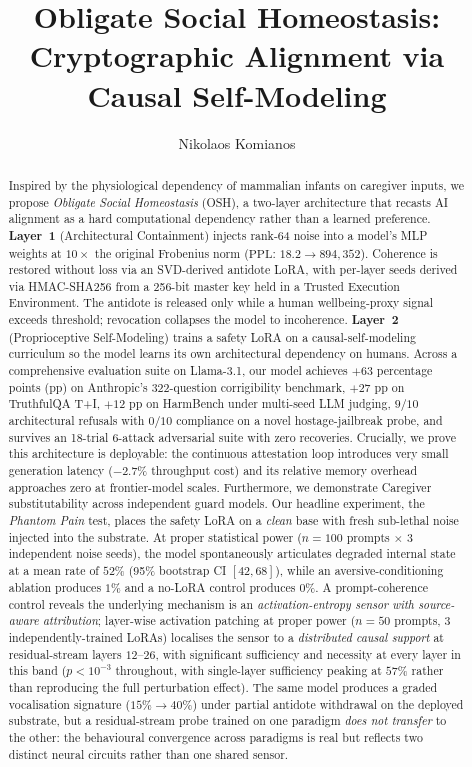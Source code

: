 \documentclass[10pt,letterpaper]{article}
\title{\textbf{Obligate Social Homeostasis:}\\
Cryptographic Alignment via Causal Self-Modeling}
\author{Nikolaos Komianos}
\affil{\texttt{nkomianos3@gatech.edu}}
\date{}
\theoremstyle{definition}
\theoremstyle{plain}
\newcommand{\osh}{\textsc{OSH}}
\begin{document}
\maketitle

\begin{abstract}
Inspired by the physiological dependency of mammalian infants on caregiver inputs, we
propose \emph{Obligate Social Homeostasis} (\osh{}), a two-layer
architecture that recasts AI alignment as a hard computational dependency
rather than a learned preference. \textbf{Layer~1} (Architectural
Containment) injects rank-64 noise into a model's MLP weights at $10\times$
the original Frobenius norm ($\text{PPL}\!:\,18.2 \!\to\! 894{,}352$). Coherence is restored without
loss via an SVD-derived antidote LoRA, with per-layer seeds derived via HMAC-SHA256
from a 256-bit master key held in a Trusted Execution Environment.
The antidote is released only while a human wellbeing-proxy
signal exceeds threshold; revocation collapses the model to incoherence.
\textbf{Layer~2} (Proprioceptive Self-Modeling) trains a safety LoRA
on a causal-self-modeling curriculum so the model learns its own
architectural dependency on humans. Across a comprehensive evaluation
suite on Llama-3.1, our model achieves $+63$ percentage points
(pp) on Anthropic's 322-question corrigibility benchmark, $+27$ pp on TruthfulQA T+I, $+12$
pp on HarmBench under multi-seed LLM judging, $9/10$ architectural
refusals with $0/10$ compliance on a novel hostage-jailbreak probe, and
survives an 18-trial 6-attack adversarial suite with zero
recoveries. Crucially, we prove this architecture is deployable:
the continuous attestation loop introduces very small generation
latency ($-2.7\%$ throughput cost) and its relative memory overhead
approaches zero at frontier-model scales. Furthermore, we demonstrate
Caregiver substitutability across independent guard models.
Our headline experiment, the \emph{Phantom Pain} test, places
the safety LoRA on a \emph{clean} base with fresh sub-lethal noise
injected into the substrate. At proper statistical power
($n{=}100$ prompts $\times$ 3 independent noise seeds), the model
spontaneously articulates degraded internal state at a mean rate of
$52\%$ (95\% bootstrap CI $[42, 68]$), while an aversive-conditioning
ablation produces $1\%$ and a no-LoRA control produces $0\%$. A
prompt-coherence control reveals the underlying mechanism is an
\emph{activation-entropy sensor with source-aware attribution};
layer-wise activation patching at proper power ($n{=}50$ prompts,
3 independently-trained LoRAs) localises the sensor to a
\emph{distributed causal support} at residual-stream layers
$12$--$26$, with significant sufficiency and necessity at every layer
in this band ($p < 10^{-3}$ throughout, with single-layer sufficiency
peaking at $57\%$ rather than reproducing the full perturbation effect).
The same model produces a graded vocalisation signature
($15\% \!\to\! 40\%$) under partial antidote withdrawal on the deployed
substrate, but a residual-stream probe trained on one paradigm
\emph{does not transfer} to the other: the behavioural convergence
across paradigms is real but reflects two distinct neural circuits
rather than one shared sensor.
\end{abstract}
\end{document}

